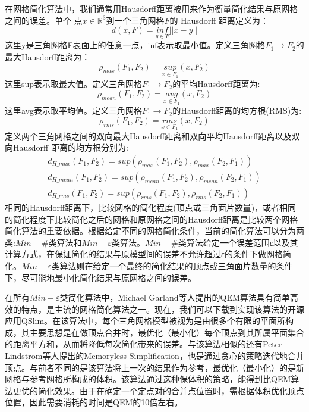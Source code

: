 在网格简化算法中，我们通常用Hausdorff距离\cite{hausdorff-dis}被用来作为衡量简化结果与原网格之间的误差。单个
点$x\in\mathbb{R}^3$到一个三角网格$F$的 Hausdorff 距离定义为：
\begin{equation}
  d(x, F) = \underset{y\in F}{inf}||x-y||
  \label{eq:v2f-haus}
\end{equation}
这里y是三角网格F表面上的任意一点，inf表示取最小值。定义三角网格$F_1 \to F_2$的最大Hausdorff距离为：
\begin{equation}
  \rho_{max}(F_1,F_2)=\underset{x\in F_1}{sup}(x,F_2)
  \label{eq:f2f-max-haus}
\end{equation}
这里sup表示取最大值。定义三角网格$F_1 \to F_2$的平均Hausdorff距离为:
\begin{equation}
  \rho_{mean}(F_1,F_2)=\underset{x\in F_1}{avg}(x,F_2)
  \label{eq:f2f-mean-haus}
\end{equation}
这里avg表示取平均值。定义三角网格$F_1 \to F_2$的Hausdorff距离的均方根(RMS)为:
\begin{equation}
  \rho_{rms}(F_1,F_2)=\underset{x\in F_1}{rms}(x,F_2)
  \label{eq:f2f-rms-haus}
\end{equation}
定义两个三角网格之间的双向最大Hausdorff距离和双向平均Hausdorff距离以及双向Hausdorff 距离的均方根分别为:
\begin{equation}
  \begin{array}{l}
    d_{H\_max}(F_1,F_2)=sup(\rho_{max}(F_1,F_2), \rho_{max}(F_2,F_1))\\
    d_{H\_mean}(F_1,F_2)=sup(\rho_{mean}(F_1,F_2), \rho_{mean}(F_2,F_1))\\
    d_{H\_rms}(F_1,F_2)=sup(\rho_{rms}(F_1,F_2), \rho_{rms}(F_2,F_1))
  \end{array}
  \label{eq:ff-haus}
\end{equation}
相同的Hausdorff距离下，比较网格的简化程度(顶点或三角面片数量)，或者相同的简化程度下比较简化之后的网格和原网格之间的Hausdorff距离是比较两个网格简化算法的重要依据。根据给定不同的网格简化条件，当前的简化算法可以分为两类:$Min−\#$类算法和$Min−\varepsilon$类算法\cite{simp-envlop}。$Min−\#$类算法给定一个误差范围ε以及其计算方式，在保证简化的结果与原模型间的误差不允许超过ε的条件下做网格简化。$Min−\varepsilon$类算法则在给定一个最终的简化结果的顶点或三角面片数量的条件下，尽可能地最小化简化结果与原网格之间的误差。\par
在所有$Min−\varepsilon$类简化算法中，Michael Garland等人提出的QEM算法\cite{qem1}具有简单高效的特点，是主流的网格简化算法之一。现在，我们可以下载到实现该算法的开源应用QSlim。在该算法中，每个三角网格模型被视为是由很多个有限的平面所构成，其主要思想是在做顶点合并时，最优化（最小化）每个顶点到其所属平面集合的距离平方和，从而将降低每次简化带来的误差。与该算法相似的还有Peter Lindstrom等人提出的Memoryless Simplification，也是通过贪心的策略迭代地合并顶点。与前者不同的是该算法将上一次的结果作为参考，最优化（最小化）的是新网格与参考网格所构成的体积。该算法通过这种保体积的策略，能得到比QEM算法更优的简化效果。由于在确定一个定点对的合并点位置时，需根据体积优化顶点位置，因此需要消耗的时间是QEM的10倍左右。\par
